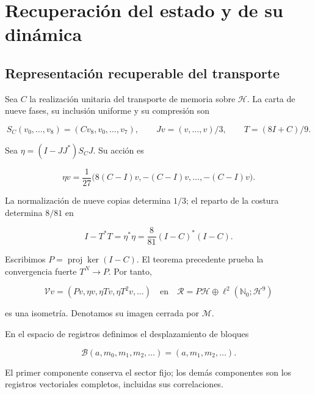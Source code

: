 \chapter{Recuperación del estado y de su dinámica}
\label{x_reciprocidad:nuclear:3}
\section{Representación recuperable del transporte}

Sea \(C\) la realización unitaria del transporte de memoria sobre \(\mathcal H\). La carta de nueve fases, su inclusión uniforme y su compresión son

\[
S_C(v_0,\ldots,v_8)=(Cv_8,v_0,\ldots,v_7),\qquad
Jv=(v,\ldots,v)/3,\qquad T=(8I+C)/9.
\]

Sea \(\eta=(I-JJ^*)S_CJ\). Su acción es

\[
\eta v=\frac1{27}\bigl(8(C-I)v,-(C-I)v,\ldots,-(C-I)v\bigr).
\]

La normalización de nueve copias determina \(1/3\); el reparto de la costura determina \(8/81\) en

\begin{equation}
I-T^*T=\eta^*\eta=\frac8{81}(I-C)^*(I-C).
\label{x_reciprocidad:nuc03:eq:1}
\end{equation}

Escribimos \(P=\operatorname{proj}\ker(I-C)\). El teorema precedente prueba la convergencia fuerte \(T^N\to P\). Por tanto,

\begin{equation}
\mathcal Vv=(Pv,\eta v,\eta Tv,\eta T^2v,\ldots)
\quad\text{en}\quad
\mathcal R=P\mathcal H\oplus\ell^2(\mathbb N_0;\mathcal H^9)
\label{x_reciprocidad:nuc03:eq:2}
\end{equation}

es una isometría. Denotamos su imagen cerrada por \(\mathcal M\).

En el espacio de registros definimos el desplazamiento de bloques

\begin{equation}
\mathcal B(a,m_0,m_1,m_2,\ldots)=(a,m_1,m_2,\ldots).
\label{x_reciprocidad:nuc03:eq:3}
\end{equation}

El primer componente conserva el sector fijo; los demás componentes son los registros vectoriales completos, incluidas sus correlaciones.

